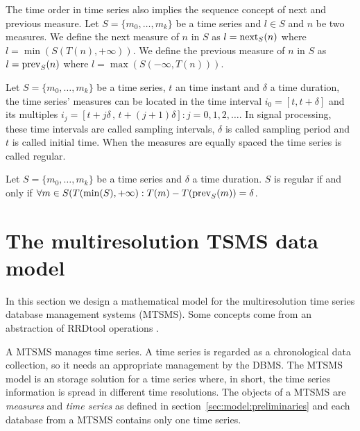 The time order in time series also implies the sequence concept of
next and previous measure.  Let $S=\{m_0, \ldots, m_k\}$ be a time
series and $l\in S$ and $n$ be two measures. We define the next
measure of $n$ in $S$ as $l=\operatorname*{next}_S(n)$ where $l =
\min(S(T(n),+\infty))$. We define the previous measure of $n$ in $S$
as $l=\operatorname*{prev}_S(n)$ where $l = \max(S(-\infty,T(n)))$.



Let $S=\{m_0,\ldots,m_k\}$ be a time series, $t$ an time instant and
$\delta$ a time duration, the time series' measures can be located in
the time interval $i_0=[t,t+\delta]$ and its multiples $i_j=[t+j\delta
\,,\, t+(j+1)\delta]: j=0,1,2,\ldots$. In signal processing, these
time intervals are called sampling intervals, $\delta$ is called
sampling period and $t$ is called initial time. When the measures are
equally spaced the time series is called regular.

\begin{definition}
  Let $S=\{m_0,\ldots,m_k\}$ be a time series and $\delta$ a time
  duration. $S$ is regular if and only if $\forall m \in
  S(T(\min(S),+\infty):T(m) - T(\operatorname*{prev}_S(m)) =
  \delta$. %
\end{definition}



\section{The multiresolution TSMS data model}
\label{sec:MTSMS}

In this section we design a mathematical model for the multiresolution
time series database management systems (MTSMS). Some concepts come
from an abstraction of RRDtool operations \cite{rrdtool}.

A MTSMS manages time series. A time series is regarded as a
chronological data collection, so it needs an appropriate management
by the DBMS.  The MTSMS model is an storage solution for a time series
where, in short, the time series information is spread in different
time resolutions.  The objects of a MTSMS are \emph{measures} and
\emph{time series} as defined in section~\ref{sec:model:preliminaries}
and each database from a MTSMS contains only one time series.

